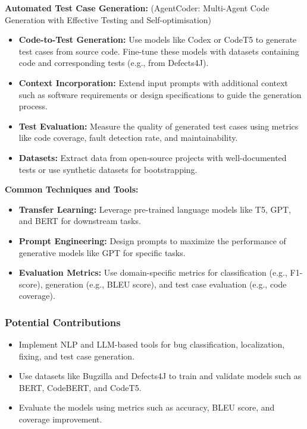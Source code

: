 \documentclass[12pt]{article}
\begin{document}
\textbf{Automated Test Case Generation:} (AgentCoder: Multi-Agent Code Generation with Effective Testing and Self-optimisation)
\begin{itemize} 
\item \textbf{Code-to-Test Generation:} Use models like Codex or CodeT5 to generate test cases from source code. Fine-tune these models with datasets containing code and corresponding tests (e.g., from Defects4J). 
\item \textbf{Context Incorporation:} Extend input prompts with additional context such as software requirements or design specifications to guide the generation process. 
\item \textbf{Test Evaluation:} Measure the quality of generated test cases using metrics like code coverage, fault detection rate, and maintainability. 
\item \textbf{Datasets:} Extract data from open-source projects with well-documented tests or use synthetic datasets for bootstrapping. 
\end{itemize}

\textbf{Common Techniques and Tools:}
\begin{itemize} 
\item \textbf{Transfer Learning:} Leverage pre-trained language models like T5, GPT, and BERT for downstream tasks. 
\item \textbf{Prompt Engineering:} Design prompts to maximize the performance of generative models like GPT for specific tasks. 
\item \textbf{Evaluation Metrics:} Use domain-specific metrics for classification (e.g., F1-score), generation (e.g., BLEU score), and test case evaluation (e.g., code coverage). 
\end{itemize}

\subsubsection*{Potential Contributions}



\begin{itemize}
    \item Implement NLP and LLM-based tools for bug classification, localization, fixing, and test case generation.
    \item Use datasets like Bugzilla and Defects4J to train and validate models such as BERT, CodeBERT, and CodeT5.
    \item Evaluate the models using metrics such as accuracy, BLEU score, and coverage improvement.
\end{itemize}
\end{document}
